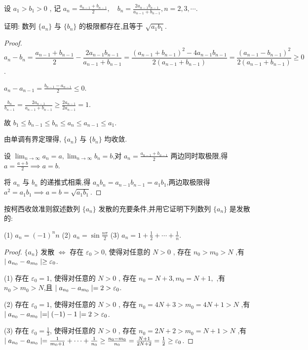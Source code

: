 \begin{practice}
    设 $a_{1}>b_{1}>0$ , 记 $a_{n}=\frac{a_{n-1}+b_{n-1}}{2},\quad b_{n}=\frac{2a_{n-1}b_{n-1}}{a_{n-1}+b_{n-1}},n=2,3,\cdots$.

    证明: 数列 $\{a_n\}$ 与 $\{b_n\}$ 的极限都存在,且等于 $\sqrt{a_1b_1}$.
\end{practice}

\begin{proof}
    $$a_n-b_n=\frac{a_{n-1}+b_{n-1}}{2}-\frac{2a_{n-1}b_{n-1}}{a_{n-1}+b_{n-1}}=\frac{(a_{n-1}+b_{n-1})^2-4a_{n-1}b_{n-1}}{2(a_{n-1}+b_{n-1})}=\frac{(a_{n-1}-b_{n-1})^2}{2(a_{n-1}+b_{n-1})}\ge 0$$.

    $a_n-a_{n-1}=\frac{b_{n-1}-a_{n-1}}{2}\le 0$. 

    $\frac{b_n}{b_{n-1}}=\frac{2a_{n-1}}{a_{n-1}+b_{n-1}}\ge \frac{2a_{n-1}}{2a_{n-1}}=1$. 

    故 $b_1\le b_{n-1} \le b_n  \le a_n \le a_{n-1} \le a_1$. 

    由单调有界定理得, $\{a_n\}$ 与 $\{b_n\}$ 均收敛.

    设 $\lim_{n\to\infty} a_n=a,\lim_{n\to\infty} b_n=b$,对 $a_{n}=\frac{a_{n-1}+b_{n-1}}{2}$  两边同时取极限,得 $a=\frac{a+b}{2} \implies a = b $. 
    
    将 $a_n$ 与 $b_n$ 的递推式相乘,得 $a_nb_n=a_{n-1}b_{n-1}=a_1b_1$,两边取极限得 $a^2=a_1b_1\implies a=b=\sqrt{a_1b_1}$.
\end{proof}

\begin{practice}
    按柯西收敛准则叙述数列 $\{a_n\}$ 发散的充要条件,并用它证明下列数列 $\{a_n\}$ 是发散的:

    (1) $a_n=(-1)^n n$ \qquad (2) $a_n=\sin \frac{n\pi}{2}$ \qquad (3) $a_n=1+\frac{1}{2}+\cdots+\frac{1}{n}$.
\end{practice}

\begin{proof}
    $\{a_n\}$ 发散 $\iff $ 存在 $\varepsilon_0>0$, 使得对任意的 $N>0$ , 存在 $n_0>m_0>N$ ,有 $\mid a_{n_0}-a_{m_0} \mid\ge \varepsilon_0$. 

    (1) 存在 $\varepsilon_0=1$, 使得对任意的 $N>0$ , 存在 $n_0=N+3,m_0=N+1,$ ,有$n_0>m_0>N$,且 $\mid a_{n_0}-a_{m_0} \mid=2>\varepsilon_0$. 

    (2) 存在 $\varepsilon_0=1$, 使得对任意的 $N>0$ , 存在 $n_0=4N+3>m_0=4N+1> N$ ,有 $\mid a_{n_0}-a_{m_0} \mid = \mid (-1)-1 \mid=2> \varepsilon_0$. 

    (3) 存在 $\varepsilon_0=\frac{1}{3}$, 使得对任意的 $N>0$ , 存在 $n_0=2N+2>m_0=N+1>N$ ,有 $\mid a_{n_0}-a_{m_0} \mid=\frac{1}{m_0+1}+\cdots+\frac{1}{n_0}\ge \frac{n_0-m_0}{n_0} = \frac{N+1}{2N+2}=\frac{1}{2} \ge \varepsilon_0$. 
\end{proof}

